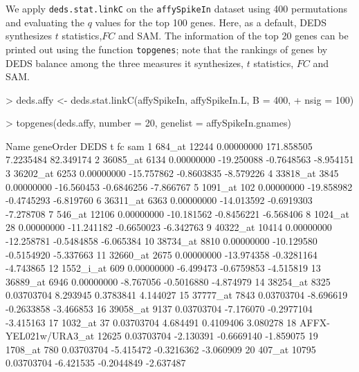 \documentclass[11pt]{article}
\newcommand{\code}[1]{{\tt #1}}
\newcommand{\Rfunc}[1]{{\tt #1}}
\begin{document}
We apply \Rfunc{deds.stat.linkC} on the \code{affySpikeIn} dataset using
400 permutations and evaluating the $q$ values for the top 100 genes. Here, 
as a default, DEDS synthesizes $t$ statistics,$FC$ and SAM. The information 
of the top 20 genes can be printed out using the function \code{topgenes};
note that the rankings of genes by DEDS balance among the three measures it 
synthesizes, $t$ statistics, $FC$ and SAM.

\begin{Schunk}
\begin{Sinput}
> deds.affy <- deds.stat.linkC(affySpikeIn, affySpikeIn.L, B = 400, 
+     nsig = 100)
\end{Sinput}
\end{Schunk}

\begin{Schunk}
\begin{Sinput}
> topgenes(deds.affy, number = 20, genelist = affySpikeIn.gnames)
\end{Sinput}
\begin{Soutput}
                   Name geneOrder       DEDS          t         fc       sam
1                684_at     12244 0.00000000 171.858505  7.2235484 82.349174
2              36085_at      6134 0.00000000 -19.250088 -0.7648563 -8.954151
3              36202_at      6253 0.00000000 -15.757862 -0.8603835 -8.579226
4              33818_at      3845 0.00000000 -16.560453 -0.6846256 -7.866767
5               1091_at       102 0.00000000 -19.858982 -0.4745293 -6.819760
6              36311_at      6363 0.00000000 -14.013592 -0.6919303 -7.278708
7                546_at     12106 0.00000000 -10.181562 -0.8456221 -6.568406
8               1024_at        28 0.00000000 -11.241182 -0.6650023 -6.342763
9              40322_at     10414 0.00000000 -12.258781 -0.5484858 -6.065384
10             38734_at      8810 0.00000000 -10.129580 -0.5154920 -5.337663
11             32660_at      2675 0.00000000 -13.974358 -0.3281164 -4.743865
12            1552_i_at       609 0.00000000  -6.499473 -0.6759853 -4.515819
13             36889_at      6946 0.00000000  -8.767056 -0.5016880 -4.874979
14             38254_at      8325 0.03703704   8.293945  0.3783841  4.144027
15             37777_at      7843 0.03703704  -8.696619 -0.2633858 -3.466853
16             39058_at      9137 0.03703704  -7.176070 -0.2977104 -3.415163
17              1032_at        37 0.03703704   4.684491  0.4109406  3.080278
18 AFFX-YEL021w/URA3_at     12625 0.03703704  -2.130391 -0.6669140 -1.859075
19              1708_at       780 0.03703704  -5.415472 -0.3216362 -3.060909
20               407_at     10795 0.03703704  -6.421535 -0.2044849 -2.637487
\end{Soutput}
\end{Schunk}
\end{document}
